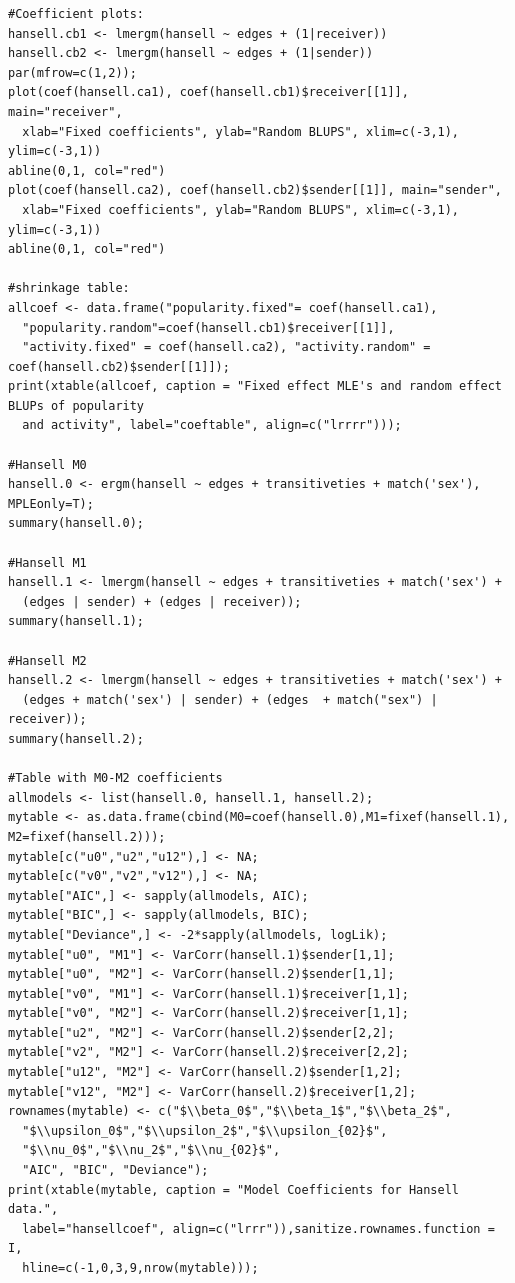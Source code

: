 \documentclass[a4paper]{article}
\begin{document}
\begin{appendices}
\begin{verbatim}
#Coefficient plots:
hansell.cb1 <- lmergm(hansell ~ edges + (1|receiver))
hansell.cb2 <- lmergm(hansell ~ edges + (1|sender))
par(mfrow=c(1,2));
plot(coef(hansell.ca1), coef(hansell.cb1)$receiver[[1]], main="receiver", 
  xlab="Fixed coefficients", ylab="Random BLUPS", xlim=c(-3,1), ylim=c(-3,1))
abline(0,1, col="red")
plot(coef(hansell.ca2), coef(hansell.cb2)$sender[[1]], main="sender", 
  xlab="Fixed coefficients", ylab="Random BLUPS", xlim=c(-3,1), ylim=c(-3,1))
abline(0,1, col="red")
	
#shrinkage table:
allcoef <- data.frame("popularity.fixed"= coef(hansell.ca1), 
  "popularity.random"=coef(hansell.cb1)$receiver[[1]], 
  "activity.fixed" = coef(hansell.ca2), "activity.random" = coef(hansell.cb2)$sender[[1]]);
print(xtable(allcoef, caption = "Fixed effect MLE's and random effect BLUPs of popularity 
  and activity", label="coeftable", align=c("lrrrr")));
  
#Hansell M0  
hansell.0 <- ergm(hansell ~ edges + transitiveties + match('sex'), MPLEonly=T);
summary(hansell.0);

#Hansell M1
hansell.1 <- lmergm(hansell ~ edges + transitiveties + match('sex') + 
  (edges | sender) + (edges | receiver));
summary(hansell.1);

#Hansell M2
hansell.2 <- lmergm(hansell ~ edges + transitiveties + match('sex') + 
  (edges + match('sex') | sender) + (edges  + match("sex") | receiver));
summary(hansell.2);

#Table with M0-M2 coefficients
allmodels <- list(hansell.0, hansell.1, hansell.2);
mytable <- as.data.frame(cbind(M0=coef(hansell.0),M1=fixef(hansell.1), M2=fixef(hansell.2)));
mytable[c("u0","u2","u12"),] <- NA;
mytable[c("v0","v2","v12"),] <- NA;
mytable["AIC",] <- sapply(allmodels, AIC);
mytable["BIC",] <- sapply(allmodels, BIC);
mytable["Deviance",] <- -2*sapply(allmodels, logLik);
mytable["u0", "M1"] <- VarCorr(hansell.1)$sender[1,1];
mytable["u0", "M2"] <- VarCorr(hansell.2)$sender[1,1];
mytable["v0", "M1"] <- VarCorr(hansell.1)$receiver[1,1];
mytable["v0", "M2"] <- VarCorr(hansell.2)$receiver[1,1];
mytable["u2", "M2"] <- VarCorr(hansell.2)$sender[2,2];
mytable["v2", "M2"] <- VarCorr(hansell.2)$receiver[2,2];
mytable["u12", "M2"] <- VarCorr(hansell.2)$sender[1,2];
mytable["v12", "M2"] <- VarCorr(hansell.2)$receiver[1,2];
rownames(mytable) <- c("$\\beta_0$","$\\beta_1$","$\\beta_2$",
  "$\\upsilon_0$","$\\upsilon_2$","$\\upsilon_{02}$",
  "$\\nu_0$","$\\nu_2$","$\\nu_{02}$",
  "AIC", "BIC", "Deviance");
print(xtable(mytable, caption = "Model Coefficients for Hansell data.", 
  label="hansellcoef", align=c("lrrr")),sanitize.rownames.function = I, 
  hline=c(-1,0,3,9,nrow(mytable)));


\end{verbatim}
\end{appendices}
\end{document}
